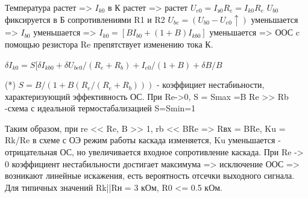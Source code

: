 \documentclass[12pt,a4paper]{article}
\begin{document}
Температура растет => $I_\textit{k0}$ в К растет => растет $U_\textit{e0} = I_\textit{э0}R_\textit{e} = I_\textit{k0}R_\textit{e}$
$U_\textit{b0}$  фиксируется в Б сопротивлениями R1 и R2
$U_\textit{be} = (U_\textit{b0}-U_\textit{e0}\uparrow)$ уменьшается => $I_\textit{b0}$ уменьшается => $I_\textit{k0} = [BI_\textit{b0}+(1+B)I_\textit{kb0}]$ уменьшается => ООС c помощью резистора Re препятствует изменению тока К.

$\delta I_\textit{k0} = S[\delta I_\textit{kb0}+\delta U_\textit{be0}/(R_e+R_b)+I_\textit{e0}/(1+B)+\delta B/B$ 

(*) $S = B/(1+B(R_e/(R_e+R_b)))$ - коэффициет нестабиьности, характеризующий эффективность ОС.
При Re->0,  S = Smax =B
Re >> Rb -схема с идеальной термостабализацией S=Smin=1

Таким образом, при re << Re, B >> 1, rb << BRe => Rвх = BRe, Ku = Rk/Re в схеме с ОЭ режим работы каскада изменяется, Ku уменьшается  - отрицательная ОС, но увеличивается входное сопротивление каскада. 
При Re -> 0 коэффициент нестабильности достигает максимума => исключение ООС => возникают линейные искажения, есть вероятность отсечки выходного сигнала.
Для типичных значений Rk||Rн = 3  кОм, R0 <= 0.5 кОм.
\end{document}
